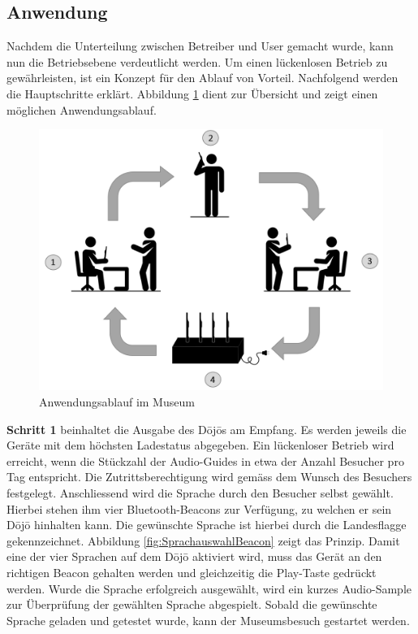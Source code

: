 \subsection{Anwendung}\label{sec:ladeablauf}
Nachdem die Unterteilung zwischen Betreiber und User gemacht wurde, kann nun die Betriebsebene verdeutlicht werden. Um einen lückenlosen Betrieb zu gewährleisten, ist ein Konzept für den Ablauf von Vorteil. Nachfolgend werden die Hauptschritte erklärt. Abbildung \ref{fig:Anwendungsablauf Dojo} dient zur Übersicht und zeigt einen möglichen Anwendungsablauf.

\begin{figure}[H]
	\begin{center}
		\includegraphics[width=120mm]{data/Ladezyklus.png}
		\caption[Anwendungsablauf des Dōjōs]{Anwendungsablauf im Museum} %
		\label{fig:Anwendungsablauf Dojo}
	\end{center}
\end{figure}

\textbf{Schritt 1} beinhaltet die Ausgabe des Dōjōs am Empfang. Es werden jeweils die Geräte mit dem höchsten Ladestatus abgegeben. Ein lückenloser Betrieb wird erreicht, wenn die Stückzahl der Audio-Guides in etwa der Anzahl Besucher pro Tag entspricht. Die Zutrittsberechtigung wird gemäss dem Wunsch des Besuchers festgelegt. Anschliessend wird die Sprache durch den Besucher selbst gewählt. Hierbei stehen ihm vier Bluetooth-Beacons zur Verfügung, zu welchen er sein Dōjō hinhalten kann. Die gewünschte Sprache ist hierbei durch die Landesflagge gekennzeichnet. Abbildung \ref{fig:SprachauswahlBeacon} zeigt das Prinzip. Damit eine der vier Sprachen auf dem Dōjō aktiviert wird, muss das Gerät an den richtigen Beacon gehalten werden und gleichzeitig die Play-Taste gedrückt werden. Wurde die Sprache erfolgreich ausgewählt, wird ein kurzes Audio-Sample zur Überprüfung der gewählten Sprache abgespielt. Sobald die gewünschte Sprache geladen und getestet wurde, kann der Museumsbesuch gestartet werden.

